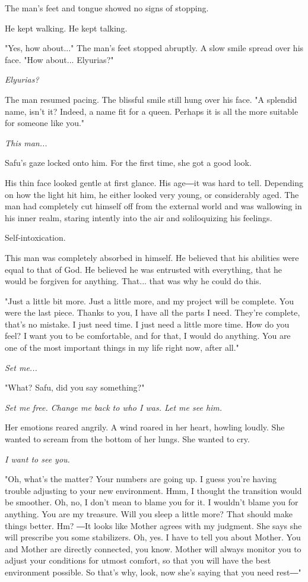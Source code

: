 The man's feet and tongue showed no signs of stopping.

He kept walking. He kept talking.

"Yes, how about..." The man's feet stopped abruptly. A slow smile spread
over his face. "How about... Elyurias?"

\emph{Elyurias?}

The man resumed pacing. The blissful smile still hung over his face. "A
splendid name, isn't it? Indeed, a name fit for a queen. Perhaps it is
all the more suitable for someone like you."

\emph{This man...}

Safu's gaze locked onto him. For the first time, she got a good look.

His thin face looked gentle at first glance. His age―it was hard to
tell. Depending on how the light hit him, he either looked very young,
or considerably aged. The man had completely cut himself off from the
external world and was wallowing in his inner realm, staring intently
into the air and soliloquizing his feelings.

Self-intoxication.

This man was completely absorbed in himself. He believed that his
abilities were equal to that of God. He believed he was entrusted with
everything, that he would be forgiven for anything. That... that was why
he could do this.

"Just a little bit more. Just a little more, and my project will be
complete. You were the last piece. Thanks to you, I have all the parts I
need. They're complete, that's no mistake. I just need time. I just need
a little more time. How do you feel? I want you to be comfortable, and
for that, I would do anything. You are one of the most important things
in my life right now, after all."

\emph{Set me...}

"What? Safu, did you say something?"

\emph{Set me free. Change me back to who I was. Let me see him.}

Her emotions reared angrily. A wind roared in her heart, howling loudly.
She wanted to scream from the bottom of her lungs. She wanted to cry.

\emph{I want to see you.}

"Oh, what's the matter? Your numbers are going up. I guess you're having
trouble adjusting to your new environment. Hmm, I thought the transition
would be smoother. Oh, no, I don't mean to blame you for it. I wouldn't
blame you for anything. You are my treasure. Will you sleep a little
more? That should make things better. Hm? ―It looks like Mother agrees
with my judgment. She says she will prescribe you some stabilizers. Oh,
yes. I have to tell you about Mother. You and Mother are directly
connected, you know. Mother will always monitor you to adjust your
conditions for utmost comfort, so that you will have the best
environment possible. So that's why, look, now she's saying that you
need rest―"

